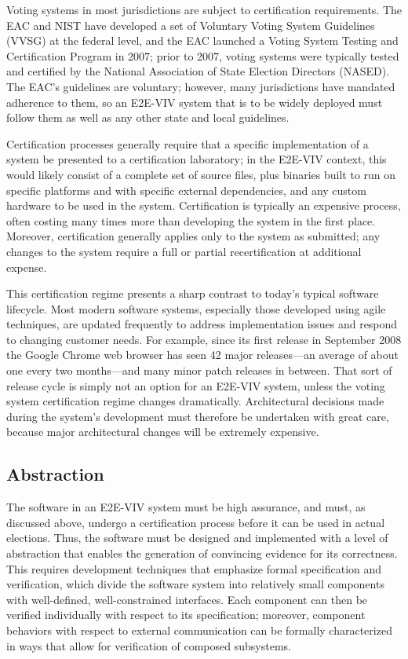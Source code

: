 Voting systems in most jurisdictions are subject to certification
requirements. The EAC and NIST have developed a set of Voluntary
Voting System Guidelines (VVSG) at the federal level, and the EAC
launched a Voting System Testing and Certification Program in 2007;
prior to 2007, voting systems were typically tested and certified by
the National Association of State Election Directors (NASED). The
EAC's guidelines are voluntary; however, many jurisdictions have
mandated adherence to them, so an E2E-VIV system that is to be widely
deployed must follow them as well as any other state and local
guidelines.

Certification processes generally require that a specific
implementation of a system be presented to a certification laboratory;
in the E2E-VIV context, this would likely consist of a complete set of
source files, plus binaries built to run on specific platforms and
with specific external dependencies, and any custom hardware to be
used in the system. Certification is typically an expensive process,
often costing many times more than developing the system in the first
place. Moreover, certification generally applies only to the system as
submitted; any changes to the system require a full or partial
recertification at additional expense.

This certification regime presents a sharp contrast to today's typical
software lifecycle. Most modern software systems, especially those
developed using agile techniques, are updated frequently to address
implementation issues and respond to changing customer needs. For
example, since its first release in September 2008 the Google Chrome
web browser has seen 42 major releases---an average of about one every
two months---and many minor patch releases in between. That sort of
release cycle is simply not an option for an E2E-VIV system, unless the
voting system certification regime changes dramatically.
Architectural decisions made during the system's development must
therefore be undertaken with great care, because major architectural
changes will be extremely expensive.

\subsection{Abstraction}

The software in an E2E-VIV system must be high assurance, and must, as
discussed above, undergo a certification process before it can be used
in actual elections. Thus, the software must be designed and
implemented with a level of abstraction that enables the generation of
convincing evidence for its correctness. This requires development
techniques that emphasize formal specification and verification, which
divide the software system into relatively small components with
well-defined, well-constrained interfaces. Each component can then be
verified individually with respect to its specification; moreover,
component behaviors with respect to external communication can be
formally characterized in ways that allow for verification of composed
subsystems.

